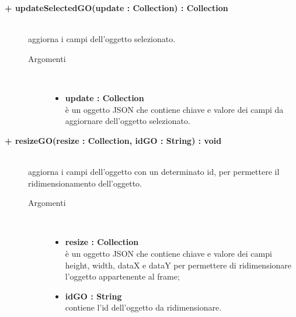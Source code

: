 \begin{description}
\begin{description}
\begin{description}
\end{description}

\end{description}

\begin{description}
		\item[\textbf{\color{blue}+ updateSelectedGO(update : Collection) : Collection			}] \hfill \\
			aggiorna i campi dell'oggetto selezionato.   

\begin{description}
			\item[Argomenti] \hfill \\
				\begin{itemize}
						\item \textbf{update : Collection			} \hfill \\
					è un oggetto JSON che contiene chiave e valore dei campi da aggiornare dell'oggetto selezionato.
				\end{itemize}

\end{description}

\end{description}

\begin{description}
		\item[\textbf{\color{blue}+ resizeGO(resize : Collection, idGO : String) : void			}] \hfill \\
			aggiorna i campi dell'oggetto con un determinato id, per permettere il ridimensionamento dell'oggetto.    

\begin{description}
			\item[Argomenti] \hfill \\
				\begin{itemize}
					\item \textbf{resize : Collection			} \hfill \\
					è un oggetto JSON che contiene chiave e valore dei campi height, width, dataX e dataY per permettere di ridimensionare l'oggetto appartenente al frame;
					\item \textbf{idGO : String			} \hfill \\
					contiene l'id dell'oggetto da ridimensionare.
				\end{itemize}

\end{description}


\end{description}
\end{description}
